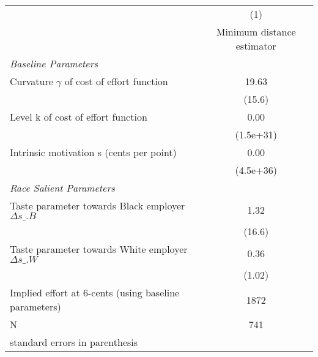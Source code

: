 {
\def\sym#1{\ifmmode^{#1}\else\(^{#1}\)\fi}
\begin{tabular*}{\hsize}{@{\hskip\tabcolsep\extracolsep\fill}l*{1}{c}}
\hline\hline
                    &\multicolumn{1}{c}{(1)}\\
                    &\multicolumn{1}{c}{Minimum distance estimator}\\
\hline
\emph{Baseline Parameters}&                     \\
[1em]
\hspace{0.2cm}Curvature $\gamma$ of cost of effort function&       19.63         \\
                    &      (15.6)         \\
[1em]
\hspace{0.2cm}Level k of cost of effort function&        0.00         \\
                    &   (1.5e+31)         \\
[1em]
\hspace{0.2cm}Intrinsic motivation s (cents per point)&        0.00         \\
                    &   (4.5e+36)         \\
[1em]
\emph{Race Salient Parameters}&                     \\
[1em]
\hspace{0.2cm}Taste parameter towards Black employer $\Delta s\_{.B}$&        1.32         \\
                    &      (16.6)         \\
[1em]
\hspace{0.2cm}Taste parameter towards White employer $\Delta s\_{.W}$&        0.36         \\
                    &      (1.02)         \\
\hline
Implied effort at 6-cents (using baseline parameters)&        1872         \\
N                   &         741         \\
\hline\hline
\multicolumn{2}{l}{\footnotesize standard errors in parenthesis}\\
\end{tabular*}
}
